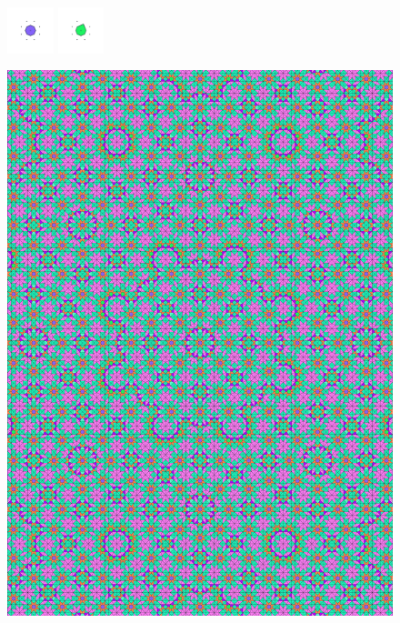 \documentclass[text.tex]{subfiles}
\begin{document}
\begin{figure}[h!]
\includegraphics[width=0.12\textwidth]{img/results/octagon/octagon_220710_(2_1alpha_2)_014.pdf}
\includegraphics[width=0.12\textwidth]{img/results/octagon/octagon_220710_(2_1alpha_2)_015.pdf}
\end{figure}

\begin{figure}[h!]
\centering
\includegraphics[width=1\textwidth]{img/results/octagon/quasi_polygon-octagon_220710_(2_1alpha_2).pdf}
\end{figure}
\end{document}
